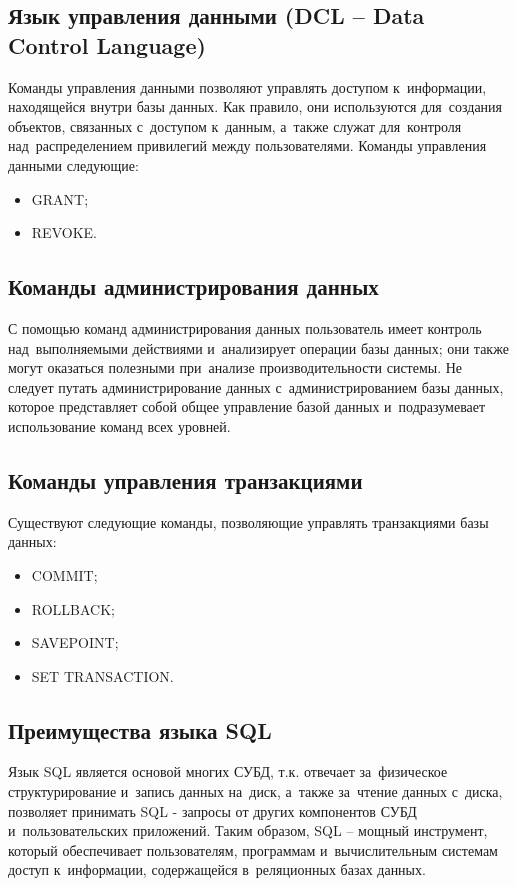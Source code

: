 \documentclass{ou}
\begin{document}
\subsection{Язык управления данными (DCL -- Data Control Language)}
Команды управления данными позволяют управлять доступом к~информации, находящейся внутри базы данных. Как правило, они используются для~создания объектов, связанных с~доступом к~данным, а~также служат для~контроля над~распределением привилегий между пользователями. Команды управления данными следующие:

\begin{itemize}[label=-, itemindent=4em, nosep]
\item GRANT;
\item REVOKE.
\end{itemize}

\subsection{Команды администрирования данных}
С помощью команд администрирования данных пользователь имеет контроль над~выполняемыми действиями и~анализирует операции базы данных; они также могут оказаться полезными при~анализе производительности системы. Не следует путать администрирование данных с~администрированием базы данных, которое представляет собой общее управление базой данных и~подразумевает использование команд всех уровней.

\subsection{Команды управления транзакциями}
Существуют следующие команды, позволяющие управлять транзакциями базы данных:

\begin{itemize}[label=-, itemindent=4em, nosep]
\item COMMIT;
\item ROLLBACK;
\item SAVEPOINT;
\item SET TRANSACTION.
\end{itemize}

\subsection{Преимущества языка SQL}
Язык SQL является основой многих СУБД, т.к. отвечает за~физическое структурирование и~запись данных на~диск, а~также за~чтение данных с~диска, позволяет принимать SQL - запросы от других компонентов СУБД и~пользовательских приложений. Таким образом, SQL -- мощный инструмент, который обеспечивает пользователям, программам и~вычислительным системам доступ к~информации, содержащейся в~реляционных базах данных.
\end{document}
